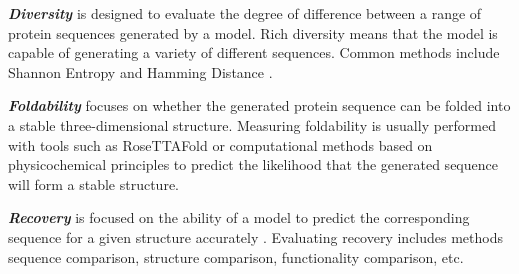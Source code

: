 \smallskip\noindent \textit{\textbf{Diversity}} is designed to evaluate the degree of difference between a range of protein sequences generated by a model. Rich diversity means that the model is capable of generating a variety of different sequences. Common methods include Shannon Entropy \cite{bywater2015prediction} and Hamming Distance \cite{mcgee2021generative}.

\smallskip\noindent \textit{\textbf{Foldability}} focuses on whether the generated protein sequence can be folded into a stable three-dimensional structure. Measuring foldability is usually performed with tools such as RoseTTAFold \cite{baek2021accurate} or computational methods based on physicochemical principles \cite{magliery2015protein} to predict the likelihood that the generated sequence will form a stable structure.

\smallskip\noindent \textit{\textbf{Recovery}} is focused on the ability of a model to predict the corresponding sequence for a given structure accurately \cite{watson2023novo}. Evaluating recovery includes methods sequence comparison, structure comparison, functionality comparison, etc.

